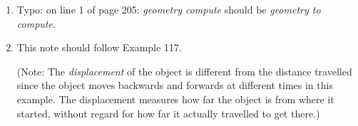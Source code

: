 \documentclass[11pt]{report}
\newcommand{\typo}[4]{\item Typo: on line #2 of page #1: \emph{#3} should be \emph{#4}.}
\begin{document}
\begin{enumerate}
{}

\typo{205}{1}{geometry compute}{geometry to compute}

\item This note should follow Example 117.

(Note: The \emph{displacement} of the object is different from the distance travelled since the object moves backwards and forwards at different times in this example. The displacement measures how far the object is from where it started, without regard for how far it actually travelled to get there.)

\end{enumerate}
\end{document}

